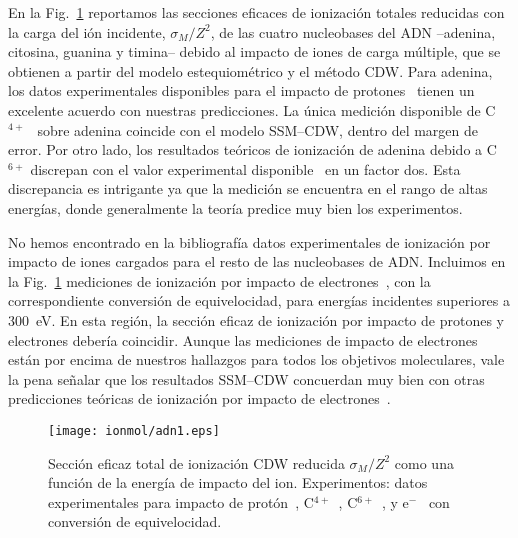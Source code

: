 En la Fig.~\ref{fig:crossDNA_1} reportamos las secciones eficaces de 
ionización totales reducidas con la carga del ión incidente, 
$\sigma_M/Z^2$, de las cuatro nucleobases del ADN --adenina, citosina, 
guanina y timina-- debido al impacto de iones de carga múltiple, que se 
obtienen a partir del modelo estequiométrico y el método CDW. Para 
adenina, los datos experimentales disponibles para el impacto de 
protones~\cite{iriki2011} tienen un excelente acuerdo con nuestras 
predicciones. La única medición disponible de C$^{4+}$~\cite{Sens:20} 
sobre adenina coincide con el modelo SSM--CDW, dentro del margen de 
error. Por otro lado, los resultados teóricos de ionización de adenina
debido a C$^{6+}$ discrepan con el valor experimental 
disponible~\cite{Bhattacharjee:19} en un factor dos. Esta discrepancia es 
intrigante ya que la medición se encuentra en el rango de altas energías, 
donde generalmente la teoría predice muy bien los experimentos.

No hemos encontrado en la bibliografía datos experimentales de ionización 
por impacto de iones cargados para el resto de las nucleobases de ADN.
Incluimos en la Fig.~\ref{fig:crossDNA_1} mediciones de ionización por 
impacto de electrones~\cite{rahman2016}, con la correspondiente 
conversión de equivelocidad, para energías incidentes superiores a 
300~eV. En esta región, la sección eficaz de ionización por impacto de 
protones y electrones debería coincidir. Aunque las mediciones de impacto 
de electrones están por encima de nuestros hallazgos para todos los 
objetivos moleculares, vale la pena señalar que los resultados SSM--CDW
concuerdan muy bien con otras predicciones teóricas de ionización por 
impacto de electrones~\cite{mozejko2003,tan2018}.

\begin{figure}
\centering
\texttt{[image: ionmol/adn1.eps]}
\caption[Sección eficaz total de ionización reducida por $Z$ (Parte I).]
{Sección eficaz total de ionización CDW reducida $\sigma_{M}/Z^2$ como 
una función de la energía de impacto del ion. 
Experimentos: datos experimentales para impacto de protón~\cite{iriki2011}, 
C$^{4+}$~\cite{Sens:20}, C$^{6+}$~\cite{Bhattacharjee:19}, y 
e$^-$~\cite{rahman2016} con conversión de equivelocidad.}
\label{fig:crossDNA_1}
\end{figure} 


